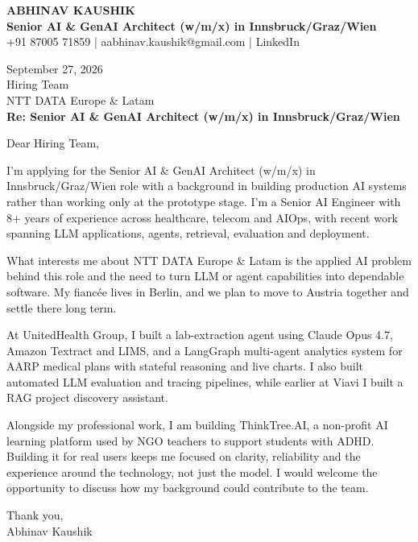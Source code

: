\documentclass[10pt,a4paper]{article}
\begin{document}
\begin{center}
{\Large\bfseries ABHINAV KAUSHIK}\\[2pt]
{\bfseries Senior AI \& GenAI Architect (w/m/x) in Innsbruck/Graz/Wien}\\[2pt]
+91 87005 71859 \quad | \quad aabhinav.kaushik@gmail.com \quad | \quad LinkedIn
\end{center}
\vspace{8pt}
September 27, 2026\\[6pt]
Hiring Team\\
NTT DATA Europe \& Latam\\[4pt]
\textbf{Re: Senior AI \& GenAI Architect (w/m/x) in Innsbruck/Graz/Wien}

Dear Hiring Team,

I’m applying for the Senior AI \& GenAI Architect (w/m/x) in Innsbruck/Graz/Wien role with a background in building production AI systems rather than working only at the prototype stage. I’m a Senior AI Engineer with 8+ years of experience across healthcare, telecom and AIOps, with recent work spanning LLM applications, agents, retrieval, evaluation and deployment.

What interests me about NTT DATA Europe \& Latam is the applied AI problem behind this role and the need to turn LLM or agent capabilities into dependable software. My fiancée lives in Berlin, and we plan to move to Austria together and settle there long term.

At UnitedHealth Group, I built a lab-extraction agent using Claude Opus 4.7, Amazon Textract and LIMS, and a LangGraph multi-agent analytics system for AARP medical plans with stateful reasoning and live charts. I also built automated LLM evaluation and tracing pipelines, while earlier at Viavi I built a RAG project discovery assistant.

Alongside my professional work, I am building ThinkTree.AI, a non-profit AI learning platform used by NGO teachers to support students with ADHD. Building it for real users keeps me focused on clarity, reliability and the experience around the technology, not just the model. I would welcome the opportunity to discuss how my background could contribute to the team.

Thank you,\\
Abhinav Kaushik
\end{document}
